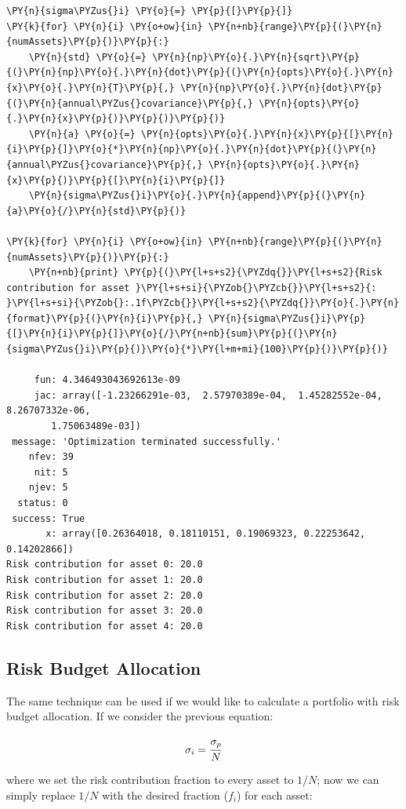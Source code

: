 \begin{tcolorbox}[breakable, size=fbox, boxrule=1pt, pad at break*=1mm,colback=cellbackground, colframe=cellborder]
\begin{Verbatim}[commandchars=\\\{\}]
\PY{n}{sigma\PYZus{}i} \PY{o}{=} \PY{p}{[}\PY{p}{]}
\PY{k}{for} \PY{n}{i} \PY{o+ow}{in} \PY{n+nb}{range}\PY{p}{(}\PY{n}{numAssets}\PY{p}{)}\PY{p}{:}
    \PY{n}{std} \PY{o}{=} \PY{n}{np}\PY{o}{.}\PY{n}{sqrt}\PY{p}{(}\PY{n}{np}\PY{o}{.}\PY{n}{dot}\PY{p}{(}\PY{n}{opts}\PY{o}{.}\PY{n}{x}\PY{o}{.}\PY{n}{T}\PY{p}{,} \PY{n}{np}\PY{o}{.}\PY{n}{dot}\PY{p}{(}\PY{n}{annual\PYZus{}covariance}\PY{p}{,} \PY{n}{opts}\PY{o}{.}\PY{n}{x}\PY{p}{)}\PY{p}{)}\PY{p}{)}
    \PY{n}{a} \PY{o}{=} \PY{n}{opts}\PY{o}{.}\PY{n}{x}\PY{p}{[}\PY{n}{i}\PY{p}{]}\PY{o}{*}\PY{n}{np}\PY{o}{.}\PY{n}{dot}\PY{p}{(}\PY{n}{annual\PYZus{}covariance}\PY{p}{,} \PY{n}{opts}\PY{o}{.}\PY{n}{x}\PY{p}{)}\PY{p}{[}\PY{n}{i}\PY{p}{]}
    \PY{n}{sigma\PYZus{}i}\PY{o}{.}\PY{n}{append}\PY{p}{(}\PY{n}{a}\PY{o}{/}\PY{n}{std}\PY{p}{)}

\PY{k}{for} \PY{n}{i} \PY{o+ow}{in} \PY{n+nb}{range}\PY{p}{(}\PY{n}{numAssets}\PY{p}{)}\PY{p}{:}
    \PY{n+nb}{print} \PY{p}{(}\PY{l+s+s2}{\PYZdq{}}\PY{l+s+s2}{Risk contribution for asset }\PY{l+s+si}{\PYZob{}\PYZcb{}}\PY{l+s+s2}{: }\PY{l+s+si}{\PYZob{}:.1f\PYZcb{}}\PY{l+s+s2}{\PYZdq{}}\PY{o}{.}\PY{n}{format}\PY{p}{(}\PY{n}{i}\PY{p}{,} \PY{n}{sigma\PYZus{}i}\PY{p}{[}\PY{n}{i}\PY{p}{]}\PY{o}{/}\PY{n+nb}{sum}\PY{p}{(}\PY{n}{sigma\PYZus{}i}\PY{p}{)}\PY{o}{*}\PY{l+m+mi}{100}\PY{p}{)}\PY{p}{)}

     fun: 4.346493043692613e-09
     jac: array([-1.23266291e-03,  2.57970389e-04,  1.45282552e-04,
8.26707332e-06,
        1.75063489e-03])
 message: 'Optimization terminated successfully.'
    nfev: 39
     nit: 5
    njev: 5
  status: 0
 success: True
       x: array([0.26364018, 0.18110151, 0.19069323, 0.22253642, 0.14202866])
Risk contribution for asset 0: 20.0
Risk contribution for asset 1: 20.0
Risk contribution for asset 2: 20.0
Risk contribution for asset 3: 20.0
Risk contribution for asset 4: 20.0
    \end{Verbatim}
\end{tcolorbox}

\subsection{Risk Budget Allocation}\label{risk-budget-allocation}

The same technique can be used if we would like to calculate a portfolio
with risk budget allocation. If we consider the previous equation:

\[ \sigma _{i}=\cfrac{\sigma_p}{N} \]

where we set the risk contribution fraction to every asset to \(1/N\);
now we can simply replace \(1/N\) with the desired fraction (\(f_i\))
for each asset:

